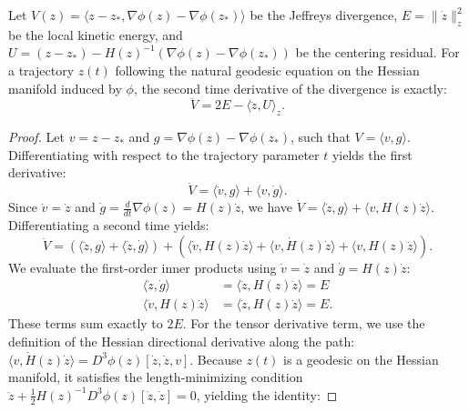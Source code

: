 \begin{lemma}
\label{lem:divergence_acceleration}
Let $V(z) = \langle z - z_*, \nabla \phi(z) - \nabla \phi(z_*) \rangle$ be the Jeffreys divergence, $E = \|\dot{z}\|_z^2$ be the local kinetic energy, and $U = (z - z_*) - H(z)^{-1}(\nabla \phi(z) - \nabla \phi(z_*))$ be the centering residual. For a trajectory $z(t)$ following the natural geodesic equation on the Hessian manifold induced by $\phi$, the second time derivative of the divergence is exactly:
\begin{equation}
    \ddot{V} = 2E - \langle \ddot{z}, U \rangle_z.
\end{equation}
\end{lemma}

\begin{proof}
Let $v = z - z_*$ and $g = \nabla \phi(z) - \nabla \phi(z_*)$, such that $V = \langle v, g \rangle$. Differentiating with respect to the trajectory parameter $t$ yields the first derivative:
\begin{equation}
    \dot{V} = \langle \dot{v}, g \rangle + \langle v, \dot{g} \rangle.
\end{equation}
Since $\dot{v} = \dot{z}$ and $\dot{g} = \frac{d}{dt}\nabla \phi(z) = H(z)\dot{z}$, we have $\dot{V} = \langle \dot{z}, g \rangle + \langle v, H(z)\dot{z} \rangle$. Differentiating a second time yields:
\begin{equation} \label{eq:vddot_expanded}
    \ddot{V} = \left( \langle \ddot{z}, g \rangle + \langle \dot{z}, \dot{g} \rangle \right) + \left( \langle \dot{v}, H(z)\dot{z} \rangle + \langle v, \dot{H}(z)\dot{z} \rangle + \langle v, H(z)\ddot{z} \rangle \right).
\end{equation}
We evaluate the first-order inner products using $\dot{v} = \dot{z}$ and $\dot{g} = H(z)\dot{z}$:
\begin{align}
    \langle \dot{z}, \dot{g} \rangle &= \langle \dot{z}, H(z)\dot{z} \rangle = E \\
    \langle \dot{v}, H(z)\dot{z} \rangle &= \langle \dot{z}, H(z)\dot{z} \rangle = E.
\end{align}
These terms sum exactly to $2E$. For the tensor derivative term, we use the definition of the Hessian directional derivative along the path: $\langle v, \dot{H}(z)\dot{z} \rangle = D^3\phi(z)[\dot{z}, \dot{z}, v]$. Because $z(t)$ is a geodesic on the Hessian manifold, it satisfies the length-minimizing condition $\ddot{z} + \frac{1}{2}H(z)^{-1}D^3\phi(z)[\dot{z}, \dot{z}] = 0$, yielding the identity:

\end{proof}
